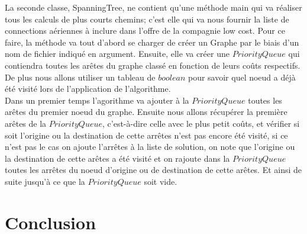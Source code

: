 \documentclass[10pt,a4paper]{article}
\begin{document}
La seconde classe, SpanningTree, ne contient qu'une méthode main qui va réaliser tous les calculs de plus courts chemins; c'est elle qui va nous fournir la liste de connections aériennes à inclure dans l'offre de la compagnie low cost. Pour ce faire, la méthode va tout d'abord se charger de créer un Graphe par le biais d'un nom de fichier indiqué en argument. Ensuite, elle va créer une $PriorityQueue$ qui contiendra toutes les arêtes du graphe classé en fonction de leurs coûts respectifs. De plus nous allons utiliser un tableau de $boolean$ pour savoir quel noeud a déjà été visité lors de l'application de l'algorithme.\\

Dans un premier temps l'agorithme va ajouter à la $PriorityQueue$ toutes les arêtes du premier noeud du graphe. Ensuite nous allons récupérer la première arêtes de la $PriorityQueue$, c'est-à-dire celle avec le plus petit coûts, et vérifier si soit l'origine ou la destination de cette arrêtes n'est pas encore été visité, si ce n'est pas le cas on ajoute l'arrêtes à la liste de solution, on note que l'origine ou la destination de cette arêtes a été visité et on rajoute dans la $PriorityQueue$ toutes les arrêtes du noeud d'origine ou de destination de cette arêtes. Et ainsi de suite jusqu'à ce que la $PriorityQueue$ soit vide.
\section*{Conclusion}
\end{document}
